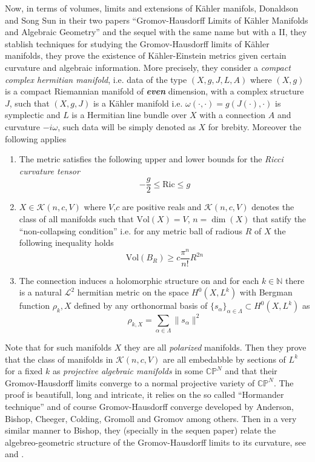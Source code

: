 \documentclass[12pt,twoside,a4paper]{report}
\newcommand{\nat}{\ensuremath{ \mathbb N }}
\newcommand{\cp}{\ensuremath{\mathbb{CP}}}
\newcommand{\lsheaf}{\ensuremath{\mathcal L }}
\begin{document}
Now, in terms of volumes, limits and extensions of Kähler manifols, Donaldson and Song Sun in their two papers ``Gromov-Hausdorff Limits of Kähler Manifolds and Algebraic Geometry'' and the sequel with the same name but with a II, they stablish techniques for studying the Gromov-Hausdorff limits of Kähler manifolds, they prove the existence of Kähler-Einstein metrics given certain curvature and algebraic information. More precisely, they consider a \emph{compact complex hermitian manifold}, i.e. data of the type $(X,g,J,L,A)$ where $(X,g)$ is a compact Riemannian manifold of \emph{\bf even} dimension, with a complex structure $J$, such that $(X,g,J)$ is a Kähler manifold i.e. $\omega(\cdot,\cdot)=g(J(\cdot),\cdot)$ is symplectic and $L$ is a Hermitian line bundle over $X$ with a connection $A$ and curvature $-i\omega$, such data will be simply denoted as $X$ for brebity. Moreover the following applies
\begin{enumerate}
  \item The metric satisfies the following upper and lower bounds for the \emph{Ricci curvature tensor}
        \begin{equation}
          -\frac{g}{2}\leq\mathrm{Ric}\leq g
        \end{equation}
  \item $X\in\mathcal{K}(n,c,V)$ where $V$,$c$ are positive reals and $\mathcal{K}(n,c,V)$ denotes the class of all manifolds such that $\mathrm{Vol}(X)=V$, $n=\dim(X)$ that satify the ``non-collapsing condition'' i.e. for any metric ball of radious $R$ of $X$ the following inequality holds
        \begin{equation}
          \mathrm{Vol}(B_R)\geq c\frac{\pi^n}{n!}R^{2n}
        \end{equation}
  \item The connection  induces a holomorphic structure on and for each $k\in\nat$ there is a natural $\lsheaf^2$ hermitian metric on the space $H^{0}(X,L^k)$ with Bergman function $\rho_k,X$ defined by any orthonormal basis of $\{s_{\alpha}\}_{\alpha\in\Lambda}\subset H^{0}(X,L^k)$ as
        \begin{equation}
          \rho_{k,X}=\sum_{\alpha\in\Lambda}\|s_{\alpha}\|^2
          \end{equation}
\end{enumerate}
Note that for such manifolds $X$ they are all \emph{polarized} manifolds. Then they prove that the class of manifolds in $\mathcal{K}(n,c,V)$ are all embedabble by sections of $L^k$ for a fixed $k$ as \emph{projective algebraic manifolds} in some $\cp^N$ and that their Gromov-Hausdorff limits converge to a normal projective variety of $\cp^N$. The proof is beautifull, long and intricate, it relies on the so called ``Hormander technique'' and of course Gromov-Hausdorff converge developed by Anderson, Bishop, Cheeger, Colding, Gromoll and Gromov among others. Then in a very similar manner to Bishop, they (specially in the sequen paper) relate the algebreo-geometric structure of the Gromov-Hausdorff limits to its curvature, see \cite{D-SS} and \cite{D-SSII}.  
\end{document}
